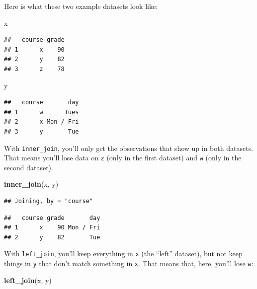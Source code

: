 \documentclass[]{book}
\makeatletter
\newenvironment{Shaded}{\begin{snugshade}}{\end{snugshade}}
\newcommand{\KeywordTok}[1]{\textcolor[rgb]{0.13,0.29,0.53}{\textbf{#1}}}
\newcommand{\NormalTok}[1]{#1}
\newenvironment{kframe}{%
\medskip{}
\setlength{\fboxsep}{.8em}
 \def\at@end@of@kframe{}%
 \ifinner\ifhmode%
  \def\at@end@of@kframe{\end{minipage}}%
  \begin{minipage}{\columnwidth}%
 \fi\fi%
 \def\FrameCommand##1{\hskip\@totalleftmargin \hskip-\fboxsep
 \colorbox{shadecolor}{##1}\hskip-\fboxsep
     \hskip-\linewidth \hskip-\@totalleftmargin \hskip\columnwidth}%
 \MakeFramed {\advance\hsize-\width
   \@totalleftmargin\z@ \linewidth\hsize
   \@setminipage}}%
 {\par\unskip\endMakeFramed%
 \at@end@of@kframe}
\renewenvironment{Shaded}{\begin{kframe}}{\end{kframe}}
\theoremstyle{definition}
\theoremstyle{definition}
\theoremstyle{definition}
\theoremstyle{remark}
\makeatother
\begin{document}
Here is what these two example datasets look like:

\begin{Shaded}
\begin{Highlighting}[]
\NormalTok{x}
\end{Highlighting}
\end{Shaded}

\begin{verbatim}
##   course grade
## 1      x    90
## 2      y    82
## 3      z    78
\end{verbatim}

\begin{Shaded}
\begin{Highlighting}[]
\NormalTok{y}
\end{Highlighting}
\end{Shaded}

\begin{verbatim}
##   course       day
## 1      w      Tues
## 2      x Mon / Fri
## 3      y       Tue
\end{verbatim}

With \texttt{inner\_join}, you'll only get the observations that show up
in both datasets. That means you'll lose data on \texttt{z} (only in the
first dataset) and \texttt{w} (only in the second dataset).

\begin{Shaded}
\begin{Highlighting}[]
\KeywordTok{inner_join}\NormalTok{(x, y)}
\end{Highlighting}
\end{Shaded}

\begin{verbatim}
## Joining, by = "course"
\end{verbatim}

\begin{verbatim}
##   course grade       day
## 1      x    90 Mon / Fri
## 2      y    82       Tue
\end{verbatim}

With \texttt{left\_join}, you'll keep everything in \texttt{x} (the
``left'' dataset), but not keep things in \texttt{y} that don't match
something in \texttt{x}. That means that, here, you'll lose \texttt{w}:

\begin{Shaded}
\begin{Highlighting}[]
\KeywordTok{left_join}\NormalTok{(x, y)}
\end{Highlighting}
\end{Shaded}
\end{document}
